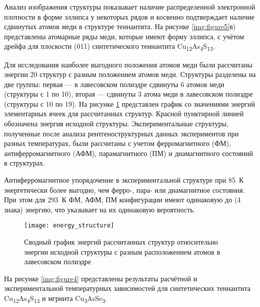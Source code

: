 Анализ изображения структуры показывает наличие распределенной электронной плотности в форме эллипса у некоторых рядов и косвенно подтверждает наличие сдвинутых атомов меди в структуре теннантита. На рисунке \ref{img:figure5}в) представлены атомарные ряды меди, которые имеют форму эллипса, с учётом дрейфа для плоскости (011) синтетического теннантита Cu\textsubscript{12}As\textsubscript{4}S\textsubscript{13}.





Для исследования наиболее выгодного положения атомов меди были рассчитаны энергии 20 структур с разным положением атомов меди.
Структуры разделены на две группы: первая --- в лавесовском полиэдре сдвинуты 6 атомов меди (структуры с 1 по 10), вторая --- сдвинуты 3 атома меди в лавесовском полиэдре (структуры с 10 по 19).
На рисунке \ref{img:th} представлен график со значениями энергий элементарных ячеек для рассчитанных структур. Красной пунктирной линией обозначена энергия исходной структуры.
Экспериментальные структуры, полученные после анализа рентгеноструктурных данных  экспериментов при разных температурах, были рассчитаны с учетом ферромагнитного (ФМ), антиферромагнитного (АФМ), парамагнитного (ПМ) и диамагнитного состояний в структурах.


Антиферромагнитное упорядочение в экспериментальной структуре при 85~К энергетически более выгодно, чем ферро-, пара- или диамагнитное состояния. При этом для 293~К ФМ, АФМ, ПМ конфигурации имеют одинаковую до (4 знака) энергию, что указывает на их одинаковую вероятность.

\begin{figure}[ht]
  \begin{minipage}[ht]{0.9\linewidth}\centering
    \texttt{[image: energy\_structure]}
  \end{minipage}

      \caption[Сводный график энергий рассчитанных структур относительно энергии исходной структуры с разным расположением атомов в лавесовском полиэдре]{Сводный график энергий рассчитанных структур относительно энергии исходной структуры с разным расположением атомов в лавесовском полиэдре}
    \label{img:th}
\end{figure}

На рисунке \ref{img:figure4} представлены результаты расчётной и экспериментальной температурных зависимостей для синтетических теннантита Cu\textsubscript{12}As\textsubscript{4}S\textsubscript{13} и мгриита Cu\textsubscript{3}AsSe\textsubscript{3}.

